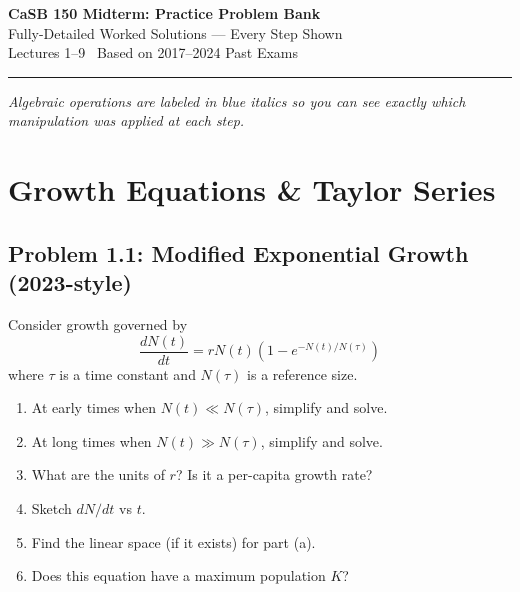 \documentclass[10pt]{article}
\begin{document}
\begin{center}
{\LARGE \textbf{CaSB 150 Midterm: Practice Problem Bank}}\\[4pt]
{\large Fully-Detailed Worked Solutions --- Every Step Shown}\\[2pt]
{\small Lectures 1--9 \textbullet\ Based on 2017--2024 Past Exams}
\end{center}

\hrule
\vspace{6pt}

\begin{center}
\small\textit{Algebraic operations are labeled in \textcolor{blue!60!black}{blue italics} so you can see exactly which manipulation was applied at each step.}
\end{center}

\tableofcontents

\newpage

\section{Growth Equations \& Taylor Series}

\subsection{Problem 1.1: Modified Exponential Growth (2023-style)}

\begin{problem}
Consider growth governed by
\[
\frac{dN(t)}{dt} = r N(t)\left(1 - e^{-N(t)/N(\tau)}\right)
\]
where $\tau$ is a time constant and $N(\tau)$ is a reference size.

\begin{enumerate}[label=(\alph*)]
\item At early times when $N(t) \ll N(\tau)$, simplify and solve.
\item At long times when $N(t) \gg N(\tau)$, simplify and solve.
\item What are the units of $r$? Is it a per-capita growth rate?
\item Sketch $dN/dt$ vs $t$.
\item Find the linear space (if it exists) for part (a).
\item Does this equation have a maximum population $K$?
\end{enumerate}
\end{problem}
\end{document}
